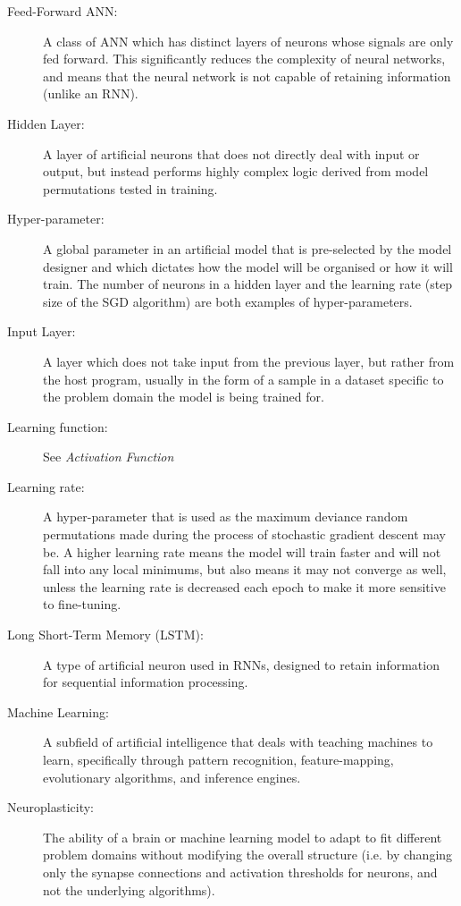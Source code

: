\documentclass[]{report}
\begin{document}
\begin{description}
\item[Feed-Forward ANN:] A class of ANN which has distinct layers of neurons whose signals are only fed forward. This significantly reduces the complexity of neural networks, and means that the neural network is not capable of retaining information (unlike an RNN).

\item[Hidden Layer:] A layer of artificial neurons that does not directly deal with input or output, but instead performs highly complex logic derived from model permutations tested in training.

\item[Hyper-parameter:] A global parameter in an artificial model that is pre-selected by the model designer and which dictates how the model will be organised or how it will train. The number of neurons in a hidden layer and the learning rate (step size of the SGD algorithm) are both examples of hyper-parameters.

\item[Input Layer:] A layer which does not take input from the previous layer, but rather from the host program, usually in the form of a sample in a dataset specific to the problem domain the model is being trained for.

\item[Learning function:] See \textit{Activation Function}

\item[Learning rate:] A hyper-parameter that is used as the maximum deviance random permutations made during the process of stochastic gradient descent may be. A higher learning rate means the model will train faster and will not fall into any local minimums, but also means it may not converge as well, unless the learning rate is decreased each epoch to make it more sensitive to fine-tuning.

\item[Long Short-Term Memory (LSTM):] A type of artificial neuron used in RNNs, designed to retain information for sequential information processing.

\item[Machine Learning:] A subfield of artificial intelligence that deals with teaching machines to learn, specifically through pattern recognition, feature-mapping, evolutionary algorithms, and inference engines.

\item[Neuroplasticity:] The ability of a brain or machine learning model to adapt to fit different problem domains without modifying the overall structure (i.e. by changing only the synapse connections and activation thresholds for neurons, and not the underlying algorithms).


\end{description}
\end{document}
